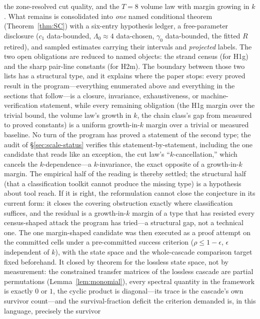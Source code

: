 \begin{enumerate}[leftmargin=1.6em,itemsep=2pt]
  the zone-resolved cut quality, and the $T=8$ volume law with margin
  growing in $k$. What remains is consolidated into \emph{one} named
  conditional theorem (Theorem~\ref{thm:SC}) with a six-entry hypothesis
  ledger, a free-parameter disclosure ($c_1$ data-bounded, $\Lambda_0\approx4$
  data-chosen, $\gamma_0$ data-bounded, the fitted $R$ retired), and
  sampled estimates carrying their intervals and \emph{projected} labels.
  The two open obligations are reduced to named objects: the strand
  census (for H1g) and the sharp pair-line constants (for H2m).
  The boundary between those two lists has a structural type, and it
  explains where the paper stops: every proved result in the
  program---everything enumerated above and everything in the sections
  that follow---is a closure, invariance, exhaustiveness, or
  machine-verification statement, while every remaining obligation (the
  H1g margin over the trivial bound, the volume law's growth in $k$, the
  chain class's gap from measured to proved constants) is a uniform
  growth-in-$k$ margin over a trivial or measured baseline. No turn of
  the program has proved a statement of the second type; the audit of
  \S\ref{sec:scale-status} verifies this statement-by-statement,
  including the one candidate that reads like an exception, the cut
  law's ``$k$-cancellation,'' which cancels the $k$-dependence---a
  $k$-invariance, the exact opposite of a growth-in-$k$ margin. The
  empirical half of the reading is thereby settled; the structural half
  (that a classification toolkit cannot produce the missing type) is a
  hypothesis about tool reach. If it is right, the reformulation cannot
  close the conjecture in its current form: it closes the covering
  obstruction exactly where classification suffices, and the residual is
  a growth-in-$k$ margin of a type that has resisted every census-shaped
  attack the program has tried---a structural gap, not a technical one.
  The one margin-shaped candidate was then executed as a proof attempt
  on the committed cells under a pre-committed success criterion
  ($\rho\le 1-\epsilon$, $\epsilon$ independent of $k$), with the state
  space and the whole-cascade comparison target fixed beforehand. It
  closed by theorem for the lossless state space, not by measurement:
  the constrained transfer
  matrices of the lossless cascade are partial permutations
(Lemma~\ref{lem:monomial}), every spectral quantity in the framework
is exactly $0$ or $1$, the cyclic product is diagonal---its trace is
the cascade's own survivor count---and the survival-fraction deficit
the criterion demanded is, in this language, precisely the survivor

\end{enumerate}
